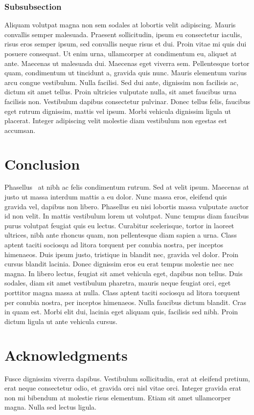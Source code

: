 \documentclass{inwwct}
\begin{document}
\subsubsection{Subsubsection}

Aliquam volutpat magna non sem sodales at lobortis velit adipiscing. Mauris convallis semper malesuada. Praesent sollicitudin,
ipsum eu consectetur iaculis, risus eros semper ipsum, sed convallis neque risus et dui. Proin vitae mi quis dui posuere
consequat. Ut enim urna, ullamcorper at condimentum eu, aliquet at ante. Maecenas ut malesuada dui. Maecenas eget viverra sem.
Pellentesque tortor quam, condimentum ut tincidunt a, gravida quis nunc. Mauris elementum varius arcu congue vestibulum. Nulla
facilisi. Sed dui ante, dignissim non facilisis ac, dictum sit amet tellus. Proin ultricies vulputate nulla, sit amet faucibus
urna facilisis non. Vestibulum dapibus consectetur pulvinar. Donec tellus felis, faucibus eget rutrum dignissim, mattis vel ipsum.
Morbi vehicula dignissim ligula ut placerat. Integer adipiscing velit molestie diam vestibulum non egestas est accumsan.

\section{Conclusion}
\label{sec:conclusion}

Phasellus~\cite{somepaper} at nibh ac felis condimentum rutrum. Sed at velit ipsum. Maecenas at justo ut massa interdum mattis a eu dolor. Nunc
massa eros, eleifend quis gravida vel, dapibus non libero. Phasellus eu nisi lobortis massa vulputate auctor id non velit. In
mattis vestibulum lorem ut volutpat. Nunc tempus diam faucibus purus volutpat feugiat quis eu lectus. Curabitur scelerisque,
tortor in laoreet ultrices, nibh ante rhoncus quam, non pellentesque diam sapien a urna. Class aptent taciti sociosqu ad litora
torquent per conubia nostra, per inceptos himenaeos. Duis ipsum justo, tristique in blandit nec, gravida vel dolor. Proin cursus
blandit lacinia. Donec dignissim eros eu erat tempus molestie nec nec magna. In libero lectus, feugiat sit amet vehicula eget,
dapibus non tellus. Duis sodales, diam sit amet vestibulum pharetra, mauris neque feugiat orci, eget porttitor magna massa at
nulla. Class aptent taciti sociosqu ad litora torquent per conubia nostra, per inceptos himenaeos. Nulla faucibus dictum blandit.
Cras in quam est. Morbi elit dui, lacinia eget aliquam quis, facilisis sed nibh. Proin dictum ligula ut ante vehicula cursus. 

\section*{Acknowledgments}
\label{sec:method}

Fusce dignissim viverra dapibus. Vestibulum sollicitudin, erat at eleifend pretium, erat neque consectetur odio, et gravida orci
nisl vitae orci. Integer gravida erat non mi bibendum at molestie risus elementum. Etiam sit amet ullamcorper magna. Nulla sed
lectus ligula.


\end{document}
